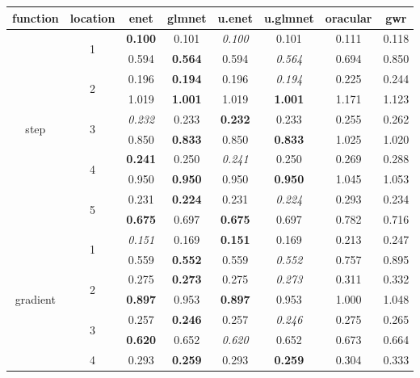 \documentclass[authoryear, review, 11pt]{elsarticle}
\begin{document}
		\begin{table}
		\thispagestyle{empty}
		\begin{center}
		\begin{tabular}{cccccccc}
 function & location & enet & glmnet & u.enet & u.glmnet & oracular & gwr \\ 
  \hline
  \multirow{10}{*}{step} & \multirow{2}{*}{1} & \textbf{0.100} & 0.101 & \emph{0.100} & 0.101 & 0.111 & 0.118 \\ 
   &  & 0.594 & \textbf{0.564} & 0.594 & \emph{0.564} & 0.694 & 0.850 \\ 
   \cline{3-8}
   & \multirow{2}{*}{2} & 0.196 & \textbf{0.194} & 0.196 & \emph{0.194} & 0.225 & 0.244 \\ 
   &  & 1.019 & \textbf{1.001} & 1.019 & \textbf{1.001} & 1.171 & 1.123 \\ 
   \cline{3-8}
   & \multirow{2}{*}{3} & \emph{0.232} & 0.233 & \textbf{0.232} & 0.233 & 0.255 & 0.262 \\ 
   &  & 0.850 & \textbf{0.833} & 0.850 & \textbf{0.833} & 1.025 & 1.020 \\ 
   \cline{3-8}
   & \multirow{2}{*}{4} & \textbf{0.241} & 0.250 & \emph{0.241} & 0.250 & 0.269 & 0.288 \\ 
   &  & 0.950 & \textbf{0.950} & 0.950 & \textbf{0.950} & 1.045 & 1.053 \\ 
   \cline{3-8}
   & \multirow{2}{*}{5} & 0.231 & \textbf{0.224} & 0.231 & \emph{0.224} & 0.293 & 0.234 \\ 
   &  & \textbf{0.675} & 0.697 & \textbf{0.675} & 0.697 & 0.782 & 0.716 \\ 
   \hline
  \multirow{10}{*}{gradient} & \multirow{2}{*}{1} & \emph{0.151} & 0.169 & \textbf{0.151} & 0.169 & 0.213 & 0.247 \\ 
   &  & 0.559 & \textbf{0.552} & 0.559 & \emph{0.552} & 0.757 & 0.895 \\ 
   \cline{3-8}
   & \multirow{2}{*}{2} & 0.275 & \textbf{0.273} & 0.275 & \emph{0.273} & 0.311 & 0.332 \\ 
   &  & \textbf{0.897} & 0.953 & \textbf{0.897} & 0.953 & 1.000 & 1.048 \\ 
   \cline{3-8}
   & \multirow{2}{*}{3} & 0.257 & \textbf{0.246} & 0.257 & \emph{0.246} & 0.275 & 0.265 \\ 
   &  & \textbf{0.620} & 0.652 & \emph{0.620} & 0.652 & 0.673 & 0.664 \\ 
   \cline{3-8}
   & \multirow{2}{*}{4} & 0.293 & \textbf{0.259} & 0.293 & \textbf{0.259} & 0.304 & 0.333 \\ 

\end{tabular}
\end{center}
\end{table}
\end{document}
